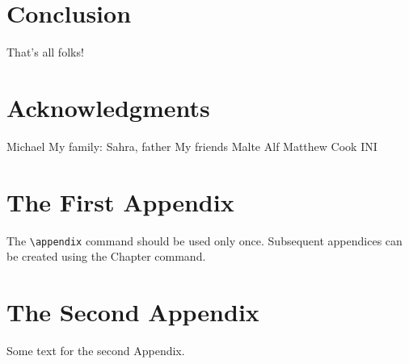 \documentclass{report}
\begin{document}
\chapter{Conclusion}

That's all folks!

\chapter{Acknowledgments}

Michael
My family: Sahra, father
My friends Malte Alf
Matthew Cook
INI

\appendix

\chapter{The First Appendix}

The \verb"\appendix" command should be used only once. Subsequent appendices can
be created using the Chapter command.

\chapter{The Second Appendix}

Some text for the second Appendix.



\end{document}

